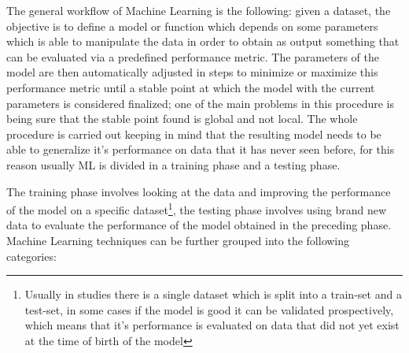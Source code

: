The general workflow of Machine Learning is the following: given a dataset, the objective is to define a model or function  which depends on some parameters which is able to manipulate the data in order to obtain as output something that can be evaluated via a predefined performance metric. The parameters of the model are then automatically adjusted in steps to minimize or maximize this performance metric until a stable point at which the model with the current parameters is considered finalized; one of the main problems in this procedure is being sure that the stable point found is global and not local. The whole procedure is carried out keeping in mind that the resulting model needs to be able to generalize it's performance on data that it has never seen before, for this reason usually ML is divided in a training phase and a testing phase. 

The training phase involves looking at the data and improving the performance of the model on a specific dataset\footnote{Usually in studies there is a single dataset which is split into a train-set and a test-set, in some cases if the model is good it can be validated prospectively, which means that it's performance is evaluated on data that did not yet exist at the time of birth of the model}, the testing phase involves using brand new data to evaluate the performance of the model obtained in the preceding phase. Machine Learning techniques can be further grouped into the following categories:

